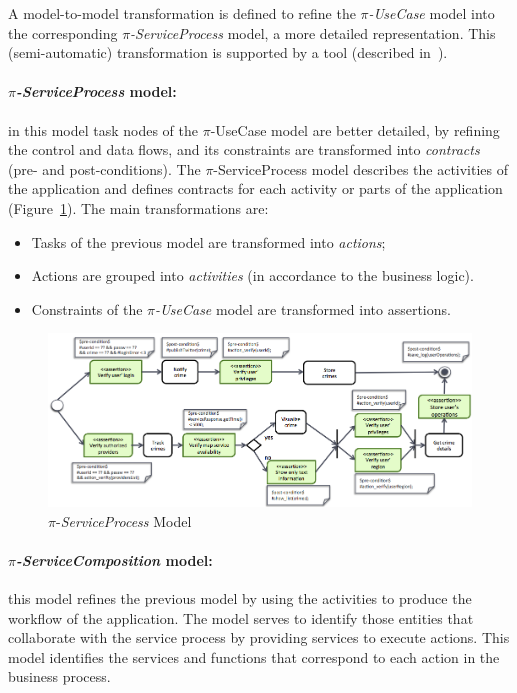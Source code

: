A model-to-model transformation is defined to refine the \textit{$\pi$-UseCase} model into the
corresponding \textit{$\pi$-ServiceProcess} model, a more detailed representation. 
This (semi-automatic) transformation  is supported by a tool (described in~\cite{PlacidoThesis2012}).


\paragraph*{\textit{$\pi$-ServiceProcess} model:}
in this model task nodes of the $\pi$-UseCase model are better detailed, by refining the control and data flows, and its constraints are transformed into \textit{contracts} (pre- and post-conditions).
The $\pi$-ServiceProcess model describes the activities of the application and defines contracts for each activity or parts of the application (Figure~\ref{fig:piSP}). The main transformations are: 
\begin{itemize}
\item Tasks of the previous model are transformed into \textit{actions};
\item Actions are grouped into \textit{activities} (in accordance to the business logic).
\item Constraints of the \textit{$\pi$-UseCase} model are transformed into assertions.
\end{itemize}

\begin{figure}[t]
\centering
\includegraphics[width=1.05\textwidth]{figs/piServiceProcess}
\caption{$\pi$-\textit{ServiceProcess} Model}
\label{fig:piSP}
\end{figure}

\paragraph*{\textit{$\pi$-ServiceComposition} model:} 
this model refines the previous model by using the activities to produce the workflow of the application.
The model serves to identify those entities that collaborate with the service process by providing services to execute actions. 
This model identifies the services and functions that correspond to each action in the business process.

